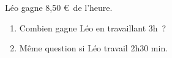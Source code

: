 \documentclass[exercice]{thedocument}%
\begin{document}
%
Léo gagne 8,50 \euro\ de l'heure.
\begin{enumerate}
    \item Combien gagne Léo en travaillant 3h~?
    \item Même question si Léo travail 2h30 min.
\end{enumerate}
\end{document}
